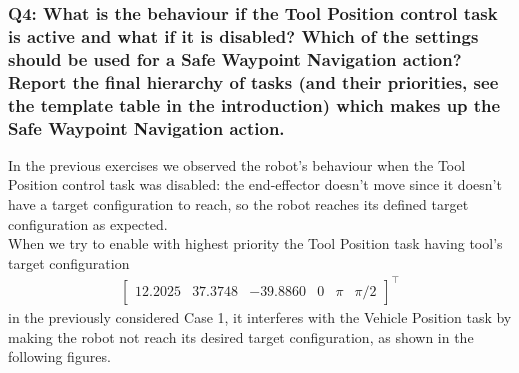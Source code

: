 \documentclass{article}
\begin{document}
\subsubsection{Q4: What is the behaviour if the Tool Position control task is active and what if it is disabled? Which of the settings should be used for a Safe Waypoint Navigation action? Report the final hierarchy of tasks (and their priorities, see the template table in the introduction) which makes up the Safe Waypoint Navigation action.}

In the previous exercises we observed the robot's behaviour when the Tool Position control task was disabled: the end-effector doesn't move since it doesn't have a target configuration to reach, so the robot reaches its defined target configuration as expected. \\
When we try to enable with highest priority the Tool Position task having tool's target configuration
\begin{gather*}
	\begin{bmatrix} 12.2025 & 37.3748 & -39.8860 & 0 & \pi & \pi/2\end{bmatrix}^\top
\end{gather*}
in the previously considered Case 1, it interferes with the Vehicle Position task by making the robot not reach its desired target configuration, as shown in the following figures.
\end{document}
